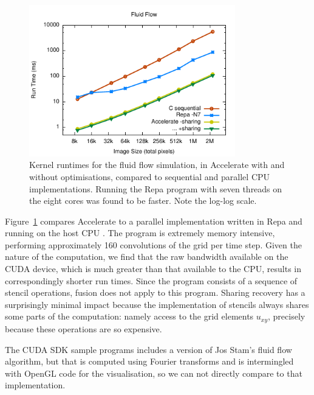 \begin{figure}
    \begin{center}
        \includegraphics[width=0.8\textwidth]{images/sec-6/fluid/fluid}
    \end{center}
    \caption[Fluid flow simulation kernel benchmarks]{Kernel runtimes for the
        fluid flow simulation, in Accelerate with and without optimisations,
        compared to sequential and parallel CPU implementations. Running the
        Repa program with seven threads on the eight cores was found to be
        faster. Note the log-log scale.}
    \label{fig:fluid}
\end{figure}

Figure~\ref{fig:fluid} compares Accelerate to a parallel implementation written
in Repa and running on the host CPU \cite{Lippmeier:2012gx}. The program is
extremely memory intensive, performing approximately 160 convolutions of the
grid per time step. Given the nature of the computation, we find that the raw
bandwidth available on the CUDA device, which is much greater than that
available to the CPU, results in correspondingly shorter run times. Since the
program consists of a sequence of stencil operations, fusion does not apply to
this program. Sharing recovery has a surprisingly minimal impact because the
implementation of stencils always shares some parts of the computation: namely
access to the grid elements $u_{xy}$, precisely because these operations are so
expensive.

The CUDA SDK sample programs includes a version of Jos Stam's fluid flow
algorithm, but that is computed using Fourier transforms and is intermingled
with OpenGL code for the visualisation, so we can not directly compare to that
implementation.

%


